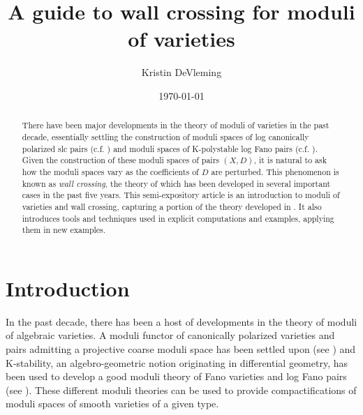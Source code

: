 \documentclass[11pt]{amsart}
\numberwithin{equation}{section}
\theoremstyle{definition}
\begin{document}
\title{A guide to wall crossing for moduli of varieties}
\author{Kristin DeVleming}
\date{\today}

\begin{abstract}
    There have been major developments in the theory of moduli of varieties in the past decade, essentially settling the construction of moduli spaces of log canonically polarized slc pairs (c.f. \cite{KolNewBook}) and moduli spaces of K-polystable log Fano pairs (c.f. \cite{Chenyang}).  Given the construction of these moduli spaces of pairs $(X, D)$, it is natural to ask how the moduli spaces vary as the coefficients of $D$ are perturbed.  This phenomenon is known as \textit{wall crossing}, the theory of which has been developed in several important cases in the past five years.  This semi-expository article is an introduction to moduli of varieties and wall crossing, capturing a portion of the theory developed in \cite{ADLpub, Zhou, ABIP, MZ, BABWILD, BL}.  It also introduces tools and techniques used in explicit computations and examples, applying them in new examples.
\end{abstract}

\maketitle



\section{Introduction}

In the past decade, there has been a host of developments in the theory of moduli of algebraic varieties.  A moduli functor of canonically polarized varieties and pairs admitting a projective coarse moduli space has been settled upon (see \cite{KolNewBook}) and K-stability, an algebro-geometric notion originating in differential geometry, has been used to develop a good moduli theory of Fano varieties and log Fano pairs (see \cite{Chenyang}).  These different moduli theories can be used to provide compactifications of moduli spaces of smooth varieties of a given type.  
\end{document}
